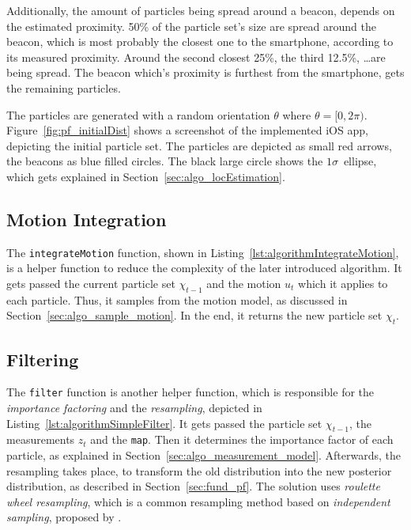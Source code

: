 Additionally, the amount of particles being spread around a beacon, depends on the estimated proximity. 50\% of the particle set's size are spread around the beacon, which is most probably the closest one to the smartphone, according to its measured proximity. Around the second closest 25\%, the third 12.5\%, \ldots are being spread. The beacon which's proximity is furthest from the smartphone, gets the remaining particles.

The particles are generated with a random orientation $\theta$ where $\theta = [0, 2\pi)$. Figure~\ref{fig:pf_initialDist} shows a screenshot of the implemented iOS app, depicting the initial particle set. The particles are depicted as small red arrows, the beacons as blue filled circles. The black large circle shows the $1\sigma$~ellipse, which gets explained in Section~\ref{sec:algo_locEstimation}.


\subsection{Motion Integration}
The \texttt{integrateMotion} function, shown in Listing~\ref{lst:algorithmIntegrateMotion}, is a helper function to reduce the complexity of the later introduced algorithm. It gets passed the current particle set $\chi_{t-1}$ and the motion $u_t$ which it applies to each particle. Thus, it samples from the motion model, as discussed in Section~\ref{sec:algo_sample_motion}. In the end, it returns the new particle set $\chi_t$.




\subsection{Filtering}
The \texttt{filter} function is another helper function, which is responsible for the \emph{importance factoring} and the \emph{resampling}, depicted in Listing~\ref{lst:algorithmSimpleFilter}. It gets passed the particle set $\chi_{t-1}$, the measurements $z_t$ and the \texttt{map}. Then it determines the importance factor of each particle, as explained in Section~\ref{sec:algo_measurement_model}. Afterwards, the resampling takes place, to transform the old distribution into the new posterior distribution, as described in Section~\ref{sec:fund_pf}. The solution uses \emph{roulette wheel resampling}, which is a common resampling method based on \emph{independent sampling}, proposed by \citet[p. 108--111]{thrun:prob_robo}.

